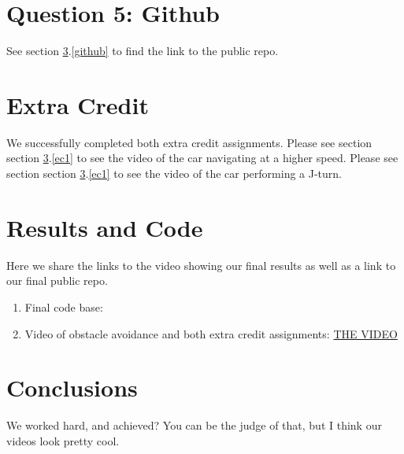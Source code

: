 \documentclass[12pt]{article}
\begin{document}
\maketitle











\section{Question 5: Github}

See section \ref{results}.\ref{github} to find the link to the public repo. 



\section{Extra Credit} 

We successfully completed both extra credit assignments. Please see section section \ref{results}.\ref{ec1} to see the video of the car navigating at a higher speed. Please see section section \ref{results}.\ref{ec1} to see the video of the car performing a J-turn. 

\section{Results and Code}\label{results}
Here we share the links to the video showing our final results as well as a link to our final public repo. 

\begin{enumerate}
	\item\label{github} Final code base: 
	\item\label{ec1} Video of obstacle avoidance and both extra credit assignments: \href{https://drive.google.com/file/d/1DpRamrBsjsI_Y-iftgcQk7L3LIv6SVPm/view?usp=sharing}{THE VIDEO}
\end{enumerate}

\section{Conclusions}\label{conclusions}
We worked hard, and achieved? You can be the judge of that, but I think our videos look pretty cool. 
\end{document}
